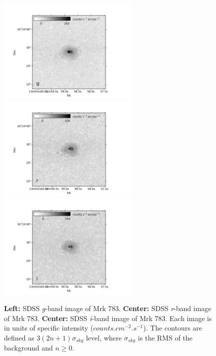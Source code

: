 \documentclass[../main.tex]{subfiles}
\begin{document}
\begin{figure}
\centering
\includegraphics[width=0.6\textwidth]{images/paper3/contours_g.jpg} \\
\includegraphics[width=0.6\textwidth]{images/paper3/contours_r.jpg} \\
\includegraphics[width=0.6\textwidth]{images/paper3/contours_i.jpg}
\caption[]{\textbf{Left:} SDSS \emph{g}-band image of Mrk 783. \textbf{Center:} SDSS \emph{r}-band image of Mrk 783. \textbf{Center:} SDSS \emph{i}-band image of Mrk 783. Each image is in units of specific intensity ($\si{counts.cm^{-2}.s^{-1}}$). The contours are defined as $3(2n+1)\sigma_{sky}$ level, where $\sigma_{sky}$ is the RMS of the background and $n\ge 0$. }
\label{fig:contours}
\end{figure}
\end{document}
